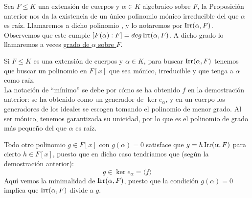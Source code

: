 \begin{definicion}
    Sea $F\leq K$ una extensión de cuerpos y $\alpha\in K$ algebraico sobre $F$, la Proposición anterior nos da la existencia de un único polinomio mónico irreducible del que $\alpha$  es raíz. Llamaremos a dicho polinomio , y lo notaremos por $\operatorname{Irr}(\alpha,F)$.\\

    \noindent
    Observemos que este cumple $[F(\alpha):F] = deg \operatorname{Irr}(\alpha,F)$. A dicho grado lo llamaremos a veces \underline{grado de $\alpha$ sobre $F$}.
\end{definicion}

\noindent
Si $F\leq K$ es una extensión de cuerpos y $\alpha\in K$, para buscar $\operatorname{Irr}(\alpha,F)$ tenemos que buscar un polinomio en $F[x]$ que sea mónico, irreducible y que tenga a $\alpha$ como raíz.\\

\noindent
La notación de ``mínimo'' se debe por cómo se ha obtenido $f$ en la demostración anterior: se ha obtenido como un generador de $\ker e_\alpha$, y en un cuerpo los generadores de los ideales se escogen tomando el polinomio de menor grado. Al ser mónico, tenemos garantizada su unicidad, por lo que es el polinomio de grado más pequeño del que $\alpha$ es raíz.

\begin{observacion}
    Todo otro polinomio $g\in F[x]$ con $g(\alpha)=0$ satisface que $g = h\operatorname{Irr}(\alpha,F)$ para cierto $h\in F[x]$, puesto que en dicho caso tendríamos que (según la demostración anterior):
    \begin{equation*}
        g \in \ker e_\alpha = \langle f \rangle 
    \end{equation*}
    Aquí vemos la minimalidad de $\operatorname{Irr}(\alpha,F)$, puesto que la condición $g(\alpha)= 0$ implica que $\operatorname{Irr}(\alpha,F)$ divide a $g$.
\end{observacion}

